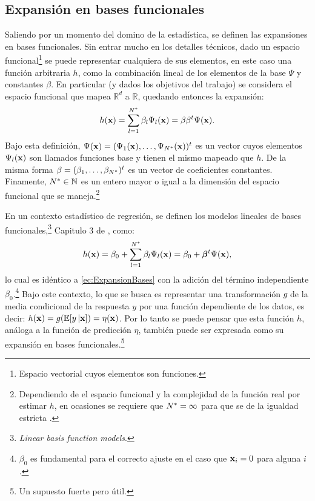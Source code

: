 \documentclass[../Main/Main.tex]{subfiles}
\begin{document}
\subsection{Expansión en bases funcionales}
Saliendo por un momento del domino de la estadística, se definen las expansiones en bases funcionales. Sin entrar mucho en los detalles técnicos, dado un espacio funcional\footnote{Espacio vectorial cuyos elementos son funciones.} se puede representar cualquiera de sus elementos, en este caso una función arbitraria $h$, como la combinación lineal de los elementos de la base $\Psi$  y constantes $\beta$. En particular (y dados los objetivos del trabajo) se considera el espacio funcional que mapea $\mathbb{R}^d$ a $\mathbb{R}$, quedando entonces la expansión: 
\begin{align} 
	h(\mathbf{x}) = \sum_{l = 1}^{N^*} \beta_l\Psi_l(\mathbf{x}) = \beta{\beta}^t\Psi(\mathbf{x}). \label{ec:ExpansionBases}
\end{align}
Bajo esta definición, $\Psi(\mathbf{x}) = (\Psi_1(\mathbf{x}),\ldots,\Psi_{N^*}(\mathbf{x}))^t$ es un vector cuyos elementos $\Psi_l(\mathbf{x})$ son llamados funciones base y tienen el mismo mapeado que $h$. De la misma forma $\beta = (\beta_1,\ldots,\beta_{N^*})^t$ es un vector de coeficientes constantes. Finamente, $N^*\in\mathbb{N}$ es un entero mayor o igual a la dimensión del espacio funcional que se maneja.\footnote{Dependiendo de el espacio funcional y la complejidad de la función real por estimar $h$, en ocasiones se requiere que $N^* = \infty$ para que se de la igualdad estricta \autocite{bergstrom1985estimation}.}

En un contexto estadístico de regresión, se definen los modelos lineales de bases funcionales,\footnote{\textit{Linear basis function models}.} Capitulo 3 de \citet{bishop2006pattern}, como:
\begin{align} 
	h(\mathbf{x}) = \beta_0 + \sum_{l = 1}^{N^*} \beta_l\Psi_l(\mathbf{x}) = \beta_0 + \bm{\beta}^t\Psi(\mathbf{x}), \label{ec:LBFM}
\end{align}
lo cual es idéntico a \eqref{ec:ExpansionBases} con la adición del término independiente $\beta_0$.\footnote{$\beta_0$ es fundamental para el correcto ajuste en el caso que $\mathbf{x}_i = 0$ para alguna $i$.} Bajo este contexto, lo que se busca es representar una transformación $g$ de la media condicional de la respuesta $y$ por una función dependiente de los datos, es decir: $h(\mathbf{x}) = g(\mathbb{E}[y\,|\mathbf{x}]) = \eta(\mathbf{x})$. Por lo tanto se puede pensar que esta función $h$, análoga a la función de predicción $\eta$, también puede ser expresada como su expansión en bases funcionales.\footnote{Un supuesto fuerte pero útil.} 
\end{document}
